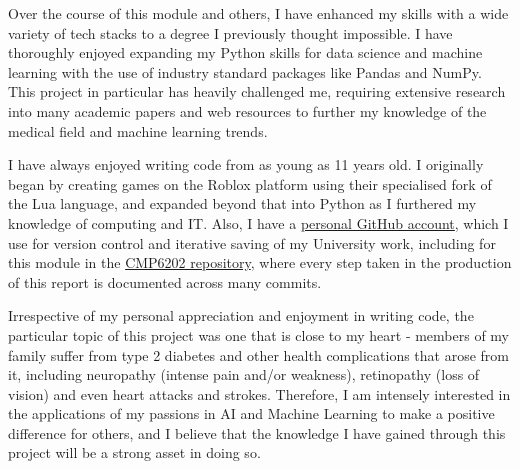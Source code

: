 \documentclass[12pt]{report}
\newcommand{\para}{\vspace{8pt}\noindent}
\begin{document}

Over the course of this module and others, I have enhanced my skills with a wide variety of tech stacks to a degree 
I previously thought impossible. I have thoroughly enjoyed expanding my Python skills for data science and machine learning 
with the use of industry standard packages like Pandas and NumPy. This project in particular has heavily challenged me, 
requiring extensive research into many academic papers and web resources to further my knowledge of the medical field 
and machine learning trends.

\para I have always enjoyed writing code from as young as 11 years old. I originally began by creating games on the Roblox platform 
using their specialised fork of the Lua language, and expanded beyond that into Python as I furthered my knowledge of computing 
and IT. Also, I have a \href{https://github.com/LewGoesB00M}{personal GitHub account}, which I use for version control and iterative 
saving of my University work, including for this module in the \href{https://github.com/LewGoesB00M/CMP6202}{CMP6202 repository}, 
where every step taken in the production of this report is documented across many commits.

\para Irrespective of my personal appreciation and enjoyment in writing code, the particular topic of this project was one 
that is close to my heart - members of my family suffer from type 2 diabetes and other health complications that arose from it,
including neuropathy (intense pain and/or weakness), retinopathy (loss of vision) and even heart attacks and strokes. 
Therefore, I am intensely interested in the applications of my passions in AI and Machine Learning to make a positive difference 
for others, and I believe that the knowledge I have gained through this project will be a strong asset in doing so.







\printbibliography
\end{document}
